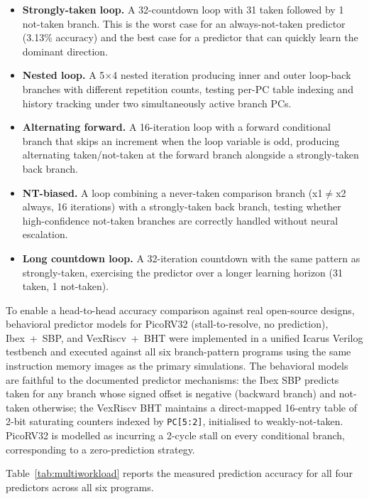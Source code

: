 \documentclass[12pt,a4paper]{article}
\begin{document}
\begin{itemize}
  \item \textbf{Strongly-taken loop.} A 32-countdown loop with 31 taken
    followed by 1 not-taken branch. This is the worst case for an
    always-not-taken predictor (3.13\% accuracy) and the best case for
    a predictor that can quickly learn the dominant direction.
  \item \textbf{Nested loop.} A 5$\times$4 nested iteration producing inner
    and outer loop-back branches with different repetition counts, testing
    per-PC table indexing and history tracking under two simultaneously
    active branch PCs.
  \item \textbf{Alternating forward.} A 16-iteration loop with a forward
    conditional branch that skips an increment when the loop variable is odd,
    producing alternating taken/not-taken at the forward branch alongside a
    strongly-taken back branch.
  \item \textbf{NT-biased.} A loop combining a never-taken comparison branch
    (x1$\neq$x2 always, 16 iterations) with a strongly-taken back branch,
    testing whether high-confidence not-taken branches are correctly handled
    without neural escalation.
  \item \textbf{Long countdown loop.} A 32-iteration countdown with the same
    pattern as strongly-taken, exercising the predictor over a longer learning
    horizon (31 taken, 1 not-taken).
\end{itemize}

To enable a head-to-head accuracy comparison against real open-source designs,
behavioral predictor models for PicoRV32 (stall-to-resolve, no prediction),
Ibex~+~SBP, and VexRiscv~+~BHT were implemented in a unified Icarus Verilog
testbench and executed against all six branch-pattern
programs using the same instruction memory images as the primary simulations.
The behavioral models are faithful to the documented predictor mechanisms:
the Ibex SBP predicts taken for any branch whose signed offset is negative
(backward branch) and not-taken otherwise; the VexRiscv BHT maintains a
direct-mapped 16-entry table of 2-bit saturating counters indexed by
\texttt{PC[5:2]}, initialised to weakly-not-taken.
PicoRV32 is modelled as incurring a 2-cycle stall on every conditional branch,
corresponding to a zero-prediction strategy.

Table~\ref{tab:multiworkload} reports the measured prediction accuracy
for all four predictors across all six programs.
\end{document}
